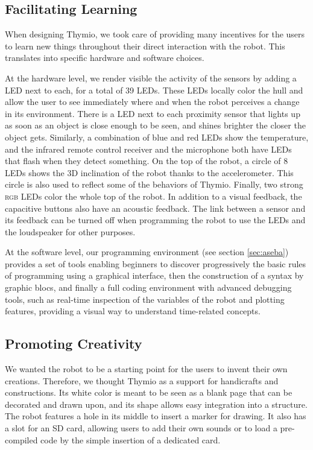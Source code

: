 \documentclass[letterpaper, 10 pt, conference]{ieeeconf}  %
\begin{document}
\subsection{Facilitating Learning}

When designing Thymio, we took care of providing many incentives for the users to learn new things throughout their direct interaction with the robot.
This translates into specific hardware and software choices.

At the hardware level, we render visible the activity of the sensors by adding a LED next to each, for a total of 39 LEDs.
These LEDs locally color the hull and allow the user to see immediately where and when the robot perceives a change in its environment.
There is a LED next to each proximity sensor that lights up as soon as an object is close enough to be seen, and shines brighter the closer the object gets.
Similarly, a combination of blue and red LEDs show the temperature, and the infrared remote control receiver and the microphone both have LEDs that flash when they detect something.
On the top of the robot, a circle of 8 LEDs shows the 3D inclination of the robot thanks to the accelerometer. 
This circle is also used to reflect some of the behaviors of Thymio.
Finally, two strong \textsc{rgb} LEDs color the whole top of the robot.
In addition to a visual feedback, the capacitive buttons also have an acoustic feedback.
The link between a sensor and its feedback can be turned off when programming the robot to use the LEDs and the loudspeaker for other purposes.

At the software level, our programming environment (see section \ref{sec:aseba}) provides a set of tools enabling beginners to discover progressively the basic rules of programming using a graphical interface, then the construction of a syntax by graphic blocs, and finally a full coding environment with advanced debugging tools, such as real-time inspection of the variables of the robot and plotting features, providing a visual way to understand time-related concepts.

\subsection{Promoting Creativity}
\label{sec:crea}

We wanted the robot to be a starting point for the users to invent their own creations.
Therefore, we thought Thymio as a support for handicrafts and constructions.
Its white color is meant to be seen as a blank page that can be decorated and drawn upon, and its shape allows easy integration into a structure.
The robot features a hole in its middle to insert a marker for drawing.
It also has a slot for an SD card, allowing users to add their own sounds or to load a pre-compiled code by the simple insertion of a dedicated card.
\end{document}
